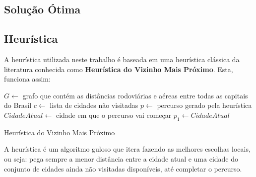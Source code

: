 \documentclass[12pt]{article}
\begin{document}
\subsection{Solução Ótima}


\subsection{Heurística}
A heurística utilizada neste trabalho é baseada em uma heurística clássica da literatura
conhecida como \textbf{Heurística do Vizinho Mais Próximo}. Esta, funciona assim:

\begin{algorithm}[h!]
\begin{footnotesize}
  $G \longleftarrow $ grafo que contém as distâncias rodoviárias e aéreas entre todas as 
  capitais do Brasil\;
  $c \longleftarrow $ lista de cidades não visitadas\;
  $p \longleftarrow $ percurso gerado pela heurística\;
  $CidadeAtual \longleftarrow $ cidade em que o percurso vai começar\;
  $p_{1} \longleftarrow CidadeAtual$\;
\caption{Heurística do Vizinho Mais Próximo}
\end{footnotesize}
\end{algorithm}

A heurística é um algoritmo guloso que itera fazendo as melhores escolhas locais, ou seja:
pega sempre a menor distância entre a cidade atual e uma cidade do conjunto de cidades ainda
não visitadas disponíveis, até completar o percurso.

\end{document}
